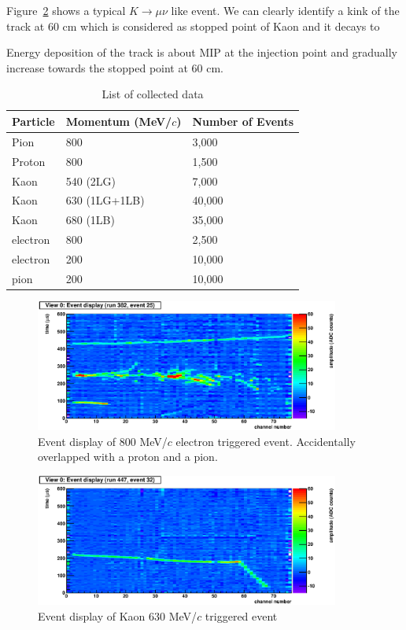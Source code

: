 Figure~\ref{Fig:Kmunu} shows a typical $K \to\mu\nu$ like event.
We can clearly identify a kink of the track at 60 cm which is considered
as stopped point of Kaon and it decays to  

Energy deposition of the track is about MIP at the injection point
and gradually increase towards the stopped point at 60 cm.



\begin{table}[h]
\begin{center}
\caption{List of collected data}
\begin{tabular}{l|ll}
  Particle  &Momentum (MeV/$c$) &Number of Events\\
\hline
  Pion      &800                &3,000\\
  Proton    &800                &1,500\\
  Kaon      &540 (2LG)          &7,000\\
  Kaon      &630 (1LG+1LB)      &40,000\\
  Kaon      &680 (1LB)          &35,000\\
  electron  &800                &2,500\\
  electron  &200                &10,000\\
  pion      &200                &10,000\\
\end{tabular}
\label{Table:Data}
\end{center}
\end{table}



\begin{figure}[htbp]
 \begin{center}
  \includegraphics[width=100mm]{fig/Textbook.eps}
 \end{center}
 \caption{Event display of 800 MeV/$c$ electron triggered event.
Accidentally overlapped with a proton and a pion.}
 \label{Fig:Textbook}
\end{figure}

\begin{figure}[htbp]
 \begin{center}
  \includegraphics[width=100mm]{fig/Kmunu.eps}
 \end{center}
 \caption{Event display of Kaon 630 MeV/$c$ triggered event}
 \label{Fig:Kmunu}
\end{figure}


